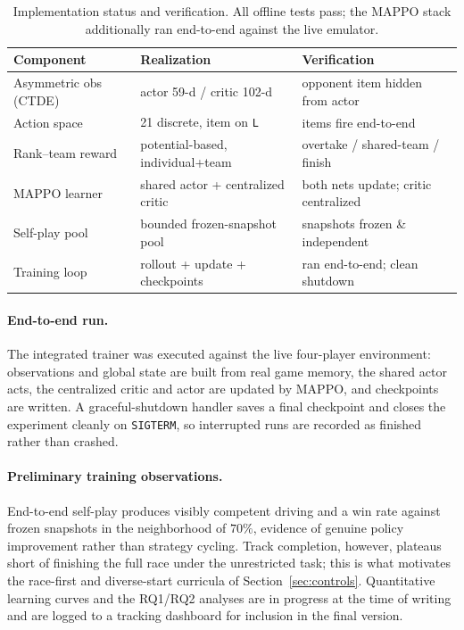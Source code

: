 \documentclass{article}
\begin{document}
\begin{table}[t]
  \caption{Implementation status and verification. All offline tests pass; the
  MAPPO stack additionally ran end-to-end against the live emulator.}
  \label{tab:status}
  \centering
  \begin{tabular}{lll}
    \toprule
    Component & Realization & Verification \\
    \midrule
    Asymmetric obs (CTDE)   & actor 59-d / critic 102-d            & opponent item hidden from actor \\
    Action space            & 21 discrete, item on \texttt{L}      & items fire end-to-end \\
    Rank--team reward       & potential-based, individual+team     & overtake / shared-team / finish \\
    MAPPO learner           & shared actor + centralized critic    & both nets update; critic centralized \\
    Self-play pool          & bounded frozen-snapshot pool         & snapshots frozen \& independent \\
    Training loop           & rollout + update + checkpoints       & ran end-to-end; clean shutdown \\
    \bottomrule
  \end{tabular}
\end{table}

\paragraph{End-to-end run.} The integrated trainer was executed against the live
four-player environment: observations and global state are built from real game
memory, the shared actor acts, the centralized critic and actor are updated by
MAPPO, and checkpoints are written. A graceful-shutdown handler saves a final
checkpoint and closes the experiment cleanly on \texttt{SIGTERM}, so interrupted
runs are recorded as finished rather than crashed.

\paragraph{Preliminary training observations.} End-to-end self-play produces
visibly competent driving and a win rate against frozen snapshots in the
neighborhood of $70\%$, evidence of genuine policy improvement rather than
strategy cycling. Track completion, however, plateaus short of finishing the full
race under the unrestricted task; this is what motivates the race-first and
diverse-start curricula of Section~\ref{sec:controls}. Quantitative learning
curves and the RQ1/RQ2 analyses are in progress at the time of writing and are
logged to a tracking dashboard for inclusion in the final version.
\end{document}
